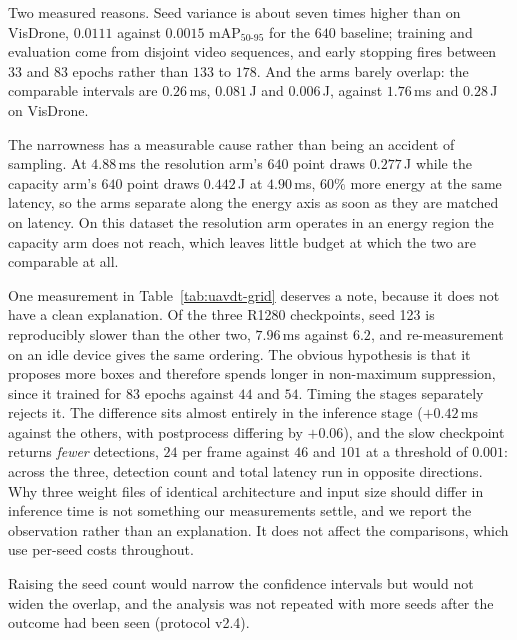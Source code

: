 Two measured reasons. Seed variance is about seven times higher than on VisDrone, $0.0111$
against $0.0015$ mAP$_{50\text{-}95}$ for the $640$ baseline; training and evaluation come
from disjoint video sequences, and early stopping fires between $33$ and $83$ epochs rather
than $133$ to $178$. And the arms barely overlap: the comparable intervals are
$0.26$\,ms, $0.081$\,J and $0.006$\,J, against $1.76$\,ms and $0.28$\,J on VisDrone.

The narrowness has a measurable cause rather than being an accident of sampling. At
$4.88$\,ms the resolution arm's $640$ point draws $0.277$\,J while the capacity arm's
$640$ point draws $0.442$\,J at $4.90$\,ms, $60\%$ more energy at the same latency, so the
arms separate along the energy axis as soon as they are matched on latency. On this dataset
the resolution arm operates in an energy region the capacity arm does not reach, which
leaves little budget at which the two are comparable at all.

One measurement in Table~\ref{tab:uavdt-grid} deserves a note, because it does not have a
clean explanation. Of the three R1280 checkpoints, seed 123 is reproducibly slower than the
other two, $7.96$\,ms against $6.2$, and re-measurement on an idle device gives the same
ordering. The obvious hypothesis is that it proposes more boxes and therefore spends longer
in non-maximum suppression, since it trained for $83$ epochs against $44$ and $54$. Timing
the stages separately rejects it. The difference sits almost entirely in the inference
stage ($+0.42$\,ms against the others, with postprocess differing by $+0.06$), and the slow
checkpoint returns \emph{fewer} detections, $24$ per frame against $46$ and $101$ at a
threshold of $0.001$: across the three, detection count and total latency run in opposite
directions. Why three weight files of identical architecture and input size should differ
in inference time is not something our measurements settle, and we report the observation
rather than an explanation. It does not affect the comparisons, which use per-seed costs
throughout.

Raising the seed count would narrow the confidence intervals but would not widen the
overlap, and the analysis was not repeated with more
seeds after the outcome had been seen (protocol v2.4).

